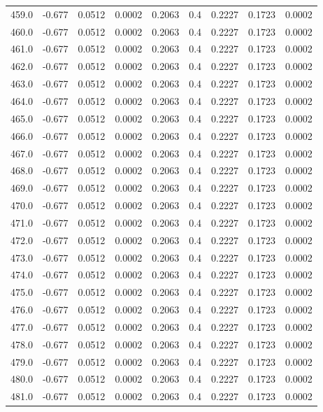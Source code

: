 \begin{longtable}{lrrrrrrrr}
459.0 & -0.677 & 0.0512 & 0.0002 & 0.2063 & 0.4 & 0.2227 & 0.1723 & 0.0002 \\
460.0 & -0.677 & 0.0512 & 0.0002 & 0.2063 & 0.4 & 0.2227 & 0.1723 & 0.0002 \\
461.0 & -0.677 & 0.0512 & 0.0002 & 0.2063 & 0.4 & 0.2227 & 0.1723 & 0.0002 \\
462.0 & -0.677 & 0.0512 & 0.0002 & 0.2063 & 0.4 & 0.2227 & 0.1723 & 0.0002 \\
463.0 & -0.677 & 0.0512 & 0.0002 & 0.2063 & 0.4 & 0.2227 & 0.1723 & 0.0002 \\
464.0 & -0.677 & 0.0512 & 0.0002 & 0.2063 & 0.4 & 0.2227 & 0.1723 & 0.0002 \\
465.0 & -0.677 & 0.0512 & 0.0002 & 0.2063 & 0.4 & 0.2227 & 0.1723 & 0.0002 \\
466.0 & -0.677 & 0.0512 & 0.0002 & 0.2063 & 0.4 & 0.2227 & 0.1723 & 0.0002 \\
467.0 & -0.677 & 0.0512 & 0.0002 & 0.2063 & 0.4 & 0.2227 & 0.1723 & 0.0002 \\
468.0 & -0.677 & 0.0512 & 0.0002 & 0.2063 & 0.4 & 0.2227 & 0.1723 & 0.0002 \\
469.0 & -0.677 & 0.0512 & 0.0002 & 0.2063 & 0.4 & 0.2227 & 0.1723 & 0.0002 \\
470.0 & -0.677 & 0.0512 & 0.0002 & 0.2063 & 0.4 & 0.2227 & 0.1723 & 0.0002 \\
471.0 & -0.677 & 0.0512 & 0.0002 & 0.2063 & 0.4 & 0.2227 & 0.1723 & 0.0002 \\
472.0 & -0.677 & 0.0512 & 0.0002 & 0.2063 & 0.4 & 0.2227 & 0.1723 & 0.0002 \\
473.0 & -0.677 & 0.0512 & 0.0002 & 0.2063 & 0.4 & 0.2227 & 0.1723 & 0.0002 \\
474.0 & -0.677 & 0.0512 & 0.0002 & 0.2063 & 0.4 & 0.2227 & 0.1723 & 0.0002 \\
475.0 & -0.677 & 0.0512 & 0.0002 & 0.2063 & 0.4 & 0.2227 & 0.1723 & 0.0002 \\
476.0 & -0.677 & 0.0512 & 0.0002 & 0.2063 & 0.4 & 0.2227 & 0.1723 & 0.0002 \\
477.0 & -0.677 & 0.0512 & 0.0002 & 0.2063 & 0.4 & 0.2227 & 0.1723 & 0.0002 \\
478.0 & -0.677 & 0.0512 & 0.0002 & 0.2063 & 0.4 & 0.2227 & 0.1723 & 0.0002 \\
479.0 & -0.677 & 0.0512 & 0.0002 & 0.2063 & 0.4 & 0.2227 & 0.1723 & 0.0002 \\
480.0 & -0.677 & 0.0512 & 0.0002 & 0.2063 & 0.4 & 0.2227 & 0.1723 & 0.0002 \\
481.0 & -0.677 & 0.0512 & 0.0002 & 0.2063 & 0.4 & 0.2227 & 0.1723 & 0.0002 \\

\end{longtable}
